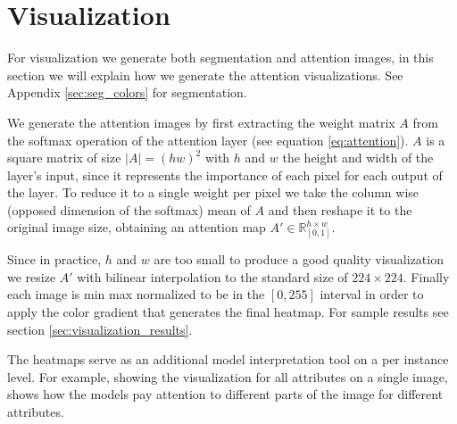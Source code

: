 \section{Visualization}
\label{sec:methodology_visualization}
For visualization we generate both segmentation and attention images, in this section
we will explain how we generate the attention visualizations. See Appendix \ref{sec:seg_colors} for segmentation.

We generate the attention images by first extracting the weight matrix $A$ from the softmax operation
of the attention layer (see equation \ref{eq:attention}). $A$  is a square matrix of size
$|A|=(hw)^2$ with $h$ and $w$ the height and width of the layer's input, since it represents
the importance of each pixel for each output of the layer. To reduce it to a single weight per pixel
we take the column wise (opposed dimension of the softmax)  mean of $A$ and
then reshape it to the original image size, obtaining an attention map $A' \in \mathbb{R}_{[0,1]}^{h \times w}$.

Since in practice, $h$ and $w$ are too small to produce a good quality visualization we resize $A'$ with
bilinear interpolation to the standard size of $224 \times 224$. Finally each image is min max normalized to be in
the $[0, 255]$ interval in order to apply the color gradient that generates the final heatmap.
For sample results see section \ref{sec:visualization_results}.

The heatmaps serve as an additional model interpretation
tool on a per instance level. For example, showing the visualization for all attributes on
a single image, shows how the models pay attention to different parts of the image for different
attributes.
